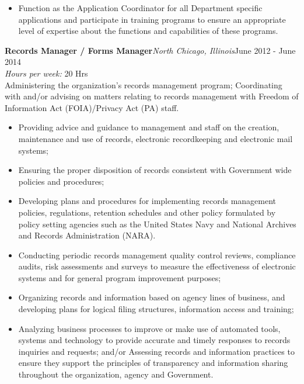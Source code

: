 \documentclass[a4papper,overlapped,line]{res}
\newcommand{\jobdes}[3]{{\bf \large #1\hspace{2ex}}{{\em \small #2}}{\hfill #3}}
\begin{document}
\begin{resume}
\begin{itemize}
	\item Function as the Application Coordinator for all Department specific applications and participate in training programs to ensure an appropriate level of expertise about the functions and capabilities of these programs.
\end{itemize}
\jobdes{Records Manager / Forms Manager}{North Chicago, Illinois}{June 2012 - June 2014}\\
\textit{Hours per week:} 20 Hrs
\\
Administering the organization’s records management program; Coordinating with and/or
advising on matters relating to records management with Freedom of Information Act
(FOIA)/Privacy Act (PA) staff.
\\
\begin{itemize}
	\item Providing advice and guidance to management and staff on the creation, maintenance 
	and use of records, electronic recordkeeping and electronic mail systems; 
	\item Ensuring the proper disposition of records consistent with Government wide policies 
	and procedures;
	\item Developing plans and procedures for implementing records management policies, 
	regulations, retention schedules and other policy formulated by policy setting 
	agencies such as the United States Navy and National Archives and Records Administration (NARA).
	\item Conducting periodic records management quality control reviews, compliance audits, 
	risk assessments and surveys to measure the effectiveness of electronic systems and 
	for general program improvement purposes; 
	\item Organizing records and information based on agency lines of business, and 
	developing plans for logical filing structures, information access and training; 
	\item Analyzing business processes to improve or make use of automated tools, systems  and technology to provide accurate and timely responses to records inquiries and  requests; and/or Assessing records and information practices to ensure they support the principles of transparency and information sharing throughout the organization, agency and Government.
\end{itemize}


\end{resume}
\end{document}
